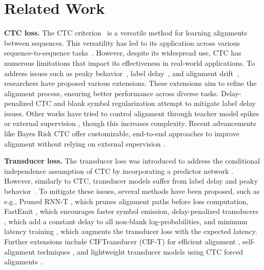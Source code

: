 \section{Related Work}
\textbf{CTC loss.}
The CTC criterion~\cite{graves2006connectionist} is a versatile method for learning alignments between sequences. This versatility has led to its application across various sequence-to-sequence tasks~\cite{st1,reorder,mtst,mt1,orc,gesture}. However, despite its widespread use, CTC has numerous limitations that impact its effectiveness in real-world applications. 
To address issues such as peaky behavior~\cite{ctc-peaky}, label delay~\cite{tian2022bayes}, and alignment drift~\cite{sak2015learning}, researchers have proposed various extensions. These extensions aim to refine the alignment process, ensuring better performance across diverse tasks.
Delay-penalized CTC \cite{yao2023delay} and blank symbol regularization \cite{yang2023blank,zhao2022investigating,bluche2015framewise} attempt to mitigate label delay issues. Other works have tried to control alignment through teacher model spikes \cite{align1,align2} or external supervision \cite{externalali,7404851,9003863}, though this increases complexity.
Recent advancements like Bayes Risk CTC offer customizable, end-to-end approaches to improve alignment without relying on external supervision \cite{tian2022bayes}.

\textbf{Transducer loss.}  
The transducer loss was introduced to address the conditional independence assumption of CTC by incorporating a predictor network \cite{graves2012sequence}.
However, similarly to CTC, transducer models suffer from label delay and peaky behavior~\cite{yu2021fastemit}.
To mitigate these issues, several methods have been proposed, such as e.g., Pruned RNN-T \cite{kuang2022pruned}, which prunes alignment paths before loss computation, FastEmit \cite{yu2021fastemit}, which encourages faster symbol emission, delay-penalized transducers \cite{kang2023delay}, which add a constant delay to all non-blank log-probabilities, and minimum latency training \cite{shinohara2022minimum}, which augments the transducer loss with the expected latency.
Further extensions include CIFTransducer (CIF-T) for efficient alignment \cite{zhang2023say}, self-alignment techniques \cite{kim2021reducing}, and lightweight transducer models using CTC forced alignments \cite{wan24_interspeech}.

